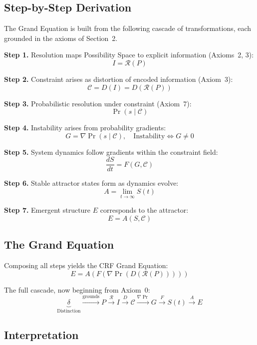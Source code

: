 \documentclass[12pt, a4paper]{article}
\begin{document}
\subsection{Step-by-Step Derivation}

The Grand Equation is built from the following cascade of transformations, each
grounded in the axioms of Section~2.

\textbf{Step 1.} Resolution maps Possibility Space to explicit information (Axioms~2, 3):
\[ I = \mathcal{R}(P) \]

\textbf{Step 2.} Constraint arises as distortion of encoded information (Axiom~3):
\[ \mathcal{C} = D(I) = D(\mathcal{R}(P)) \]

\textbf{Step 3.} Probabilistic resolution under constraint (Axiom~7):
\[ \Pr(s \mid \mathcal{C}) \]

\textbf{Step 4.} Instability arises from probability gradients:
\[ G = \nabla\Pr(s\mid\mathcal{C}), \quad \text{Instability} \Leftrightarrow G \neq 0 \]

\textbf{Step 5.} System dynamics follow gradients within the constraint field:
\[ \frac{dS}{dt} = F(G, \mathcal{C}) \]

\textbf{Step 6.} Stable attractor states form as dynamics evolve:
\[ A = \lim_{t\to\infty} S(t) \]

\textbf{Step 7.} Emergent structure $E$ corresponds to the attractor:
\[ E = A(S, \mathcal{C}) \]

\subsection{The Grand Equation}

Composing all steps yields the CRF Grand Equation:
\begin{equation}
  E = A\!\left(F\!\left(\nabla\Pr\!\left(D(\mathcal{R}(P))\right)\right)\right)
  \label{eq:grand}
\end{equation}

The full cascade, now beginning from Axiom~0:
\begin{equation}
  \underbrace{\delta}_{\text{Distinction}}
  \xrightarrow{\text{grounds}} P
  \xrightarrow{\mathcal{R}} I
  \xrightarrow{D} \mathcal{C}
  \xrightarrow{\nabla\Pr} G
  \xrightarrow{F} S(t)
  \xrightarrow{A} E
  \label{eq:cascade}
\end{equation}

\subsection{Interpretation}
\end{document}
